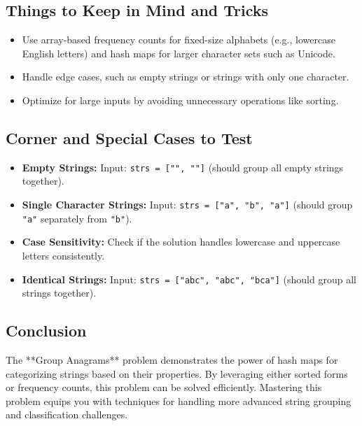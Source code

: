 \subsection*{Things to Keep in Mind and Tricks}
\begin{itemize}
    \item Use array-based frequency counts for fixed-size alphabets (e.g., lowercase English letters) and hash maps for larger character sets such as Unicode.
    \item Handle edge cases, such as empty strings or strings with only one character.
    \item Optimize for large inputs by avoiding unnecessary operations like sorting.
\end{itemize}

\subsection*{Corner and Special Cases to Test}
\begin{itemize}
    \item \textbf{Empty Strings:} Input: \texttt{strs = ["", ""]} (should group all empty strings together).
    \item \textbf{Single Character Strings:} Input: \texttt{strs = ["a", "b", "a"]} (should group \texttt{"a"} separately from \texttt{"b"}).
    \item \textbf{Case Sensitivity:} Check if the solution handles lowercase and uppercase letters consistently.
    \item \textbf{Identical Strings:} Input: \texttt{strs = ["abc", "abc", "bca"]} (should group all strings together).
\end{itemize}

\subsection*{Conclusion}
The **Group Anagrams** problem demonstrates the power of hash maps for categorizing strings based on their properties. By leveraging either sorted forms or frequency counts, this problem can be solved efficiently. Mastering this problem equips you with techniques for handling more advanced string grouping and classification challenges.